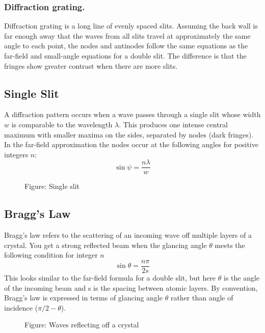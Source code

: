 \documentclass[../../../main.tex]{subfiles}
\begin{document}
\subsubsection{Diffraction grating.} Diffraction grating is a long line of evenly spaced slits. Assuming the back wall is far enough away that the waves from all slits travel at approximately the same angle to each point, the nodes and antinodes follow the same equations as the far-field and small-angle equations for a double slit. The difference is that the fringes show greater contrast when there are more slits. 

\subsection{Single Slit}
A diffraction pattern occurs when a wave passes through a single slit whose width $w$ is comparable to the wavelength $\lambda$. This produces one intense central maximum with smaller maxima on the sides, separated by nodes (dark fringes). In the far-field approximation the nodes occur at the following angles for positive integers $n$:
\begin{equation*}
    \sin \psi=\frac{n\lambda}{w}
\end{equation*}
\begin{figure}
    \centering
    \caption*{Figure: Single slit}
\end{figure}

\subsection{Bragg's Law}
Bragg's law refers to the scattering of an incoming wave off multiple layers of a crystal. You get a strong reflected beam when the glancing angle $\theta$ meets the following condition for integer $n$
\begin{equation*}
    \sin \theta=\frac{n\pi}{2s}
\end{equation*}
This looks similar to the far-field formula for a double slit, but here $\theta$ is the angle of the incoming beam and s is the spacing between atomic layers. By convention, Bragg's law is expressed in terms of glancing angle $\theta$ rather than angle of incidence ($\pi/2 - \theta$).
\begin{figure}
    \centering
    \caption*{Figure: Waves reflecting off a crystal}
\end{figure}
\end{document}
